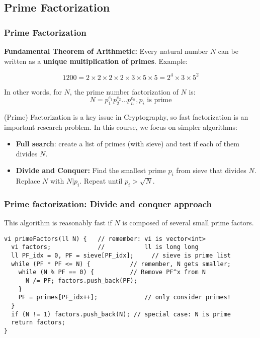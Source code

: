 \subsection{Prime Factorization}
\begin{frame}
  \frametitle{Prime Factorization}

  {\bf Fundamental Theorem of Arithmetic:} Every natural number $N$ can be written as a {\bf unique multiplication of primes}. Example:

  \begin{equation*}
    1200 = 2\times2\times2\times2\times3\times5\times5 = 2^4\times3\times5^2
  \end{equation*}

  In other words, for $N$, the prime number factorization of $N$ is:
    \begin{equation*}
      N=p_1^{e_1}p_2^{e_2}\ldots p_n^{e_n}, p_i \text{ is prime}
    \end{equation*}

  (Prime) Factorization is a key issue in Cryptography, so fast factorization is an important research problem. In this course, we focus on simpler algorithms:\bigskip

  \begin{itemize}
    \item {\bf Full search}: create a list of primes (with sieve) and test if each of them divides $N$.
    \item {\bf Divide and Conquer:} Find the smallest prime $p_i$ from sieve that divides $N$. Replace $N$ with $N|p_i$. Repeat until $p_i > \sqrt{N}$.
  \end{itemize}
\end{frame}

\begin{frame}[fragile]
  \frametitle{Prime factorization: Divide and conquer approach}

  This algorithm is reasonably fast if $N$ is composed of several small prime factors.

  {\smaller
  \begin{exampleblock}{}
\begin{verbatim}
vi primeFactors(ll N) {   // remember: vi is vector<int>
  vi factors;             //           ll is long long
  ll PF_idx = 0, PF = sieve[PF_idx];     // sieve is prime list
  while (PF * PF <= N) {           // remember, N gets smaller;
    while (N % PF == 0) {          // Remove PF^x from N
      N /= PF; factors.push_back(PF);
    }
    PF = primes[PF_idx++];             // only consider primes!
  }
  if (N != 1) factors.push_back(N); // special case: N is prime
  return factors;
}
\end{verbatim}
  \end{exampleblock}}
\end{frame}


